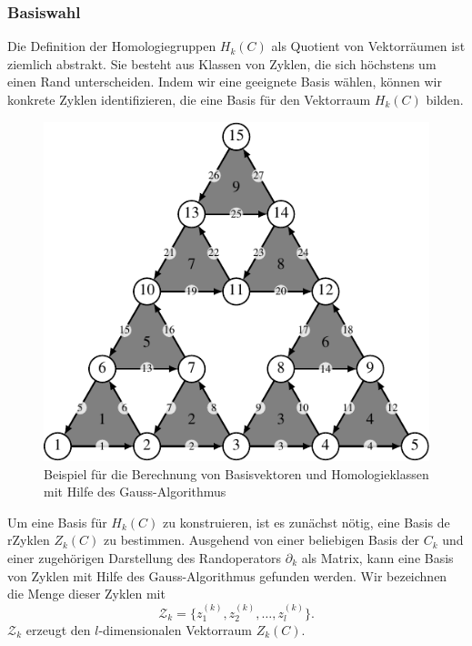\subsubsection{Basiswahl}
Die Definition der Homologiegruppen $H_k(C)$ als Quotient von
Vektorräumen ist ziemlich abstrakt.
Sie besteht aus Klassen von Zyklen, die sich höchstens um einen
Rand unterscheiden.
Indem wir eine geeignete Basis wählen, können wir konkrete Zyklen
identifizieren, die eine Basis für den Vektorraum $H_k(C)$ bilden.

\begin{figure}
\centering
\includegraphics{chapters/95-homologie/images/gausshomoex.pdf}
\caption{Beispiel für die Berechnung von Basisvektoren und Homologieklassen
mit Hilfe des Gauss-Algorithmus
\label{buch:homologie:fig:gausshomoex}}
\end{figure}

Um eine Basis für $H_k(C)$ zu konstruieren, ist es zunächst nötig,
eine Basis de rZyklen $Z_k(C)$ zu bestimmen.
Ausgehend von einer beliebigen Basis der $C_k$ und einer 
zugehörigen Darstellung des Randoperators $\partial_k$ als
Matrix, kann eine Basis von Zyklen mit Hilfe des Gauss-Algorithmus
gefunden werden.
Wir bezeichnen die Menge dieser Zyklen mit
\[
\mathcal{Z}_k 
=
\{
z_1^{(k)},
z_2^{(k)},
\dots,
z_l^{(k)}
\}.
\]
$\mathcal{Z}_k$ erzeugt den $l$-dimensionalen Vektorraum $Z_k(C)$.

